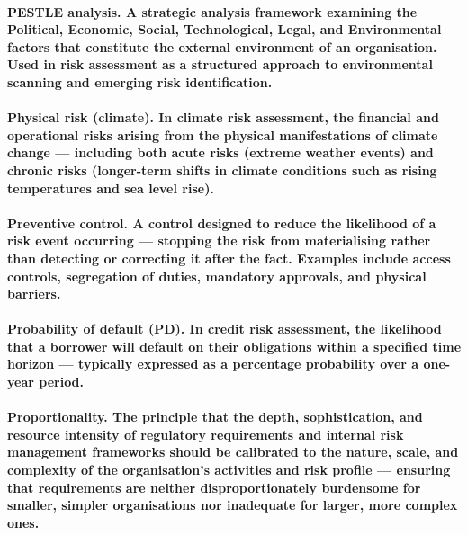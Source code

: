 \paragraph{\textbf{PESTLE analysis}. A strategic analysis framework examining the Political, Economic, Social, Technological, Legal, and Environmental factors that constitute the external environment of an organisation. Used in risk assessment as a structured approach to environmental scanning and emerging risk identification.}

\paragraph{\textbf{Physical risk (climate)}. In climate risk assessment, the financial and operational risks arising from the physical manifestations of climate change — including both acute risks (extreme weather events) and chronic risks (longer-term shifts in climate conditions such as rising temperatures and sea level rise).}

\paragraph{\textbf{Preventive control}. A control designed to reduce the likelihood of a risk event occurring — stopping the risk from materialising rather than detecting or correcting it after the fact. Examples include access controls, segregation of duties, mandatory approvals, and physical barriers.}

\paragraph{\textbf{Probability of default (PD)}. In credit risk assessment, the likelihood that a borrower will default on their obligations within a specified time horizon — typically expressed as a percentage probability over a one-year period.}

\paragraph{\textbf{Proportionality}. The principle that the depth, sophistication, and resource intensity of regulatory requirements and internal risk management frameworks should be calibrated to the nature, scale, and complexity of the organisation's activities and risk profile — ensuring that requirements are neither disproportionately burdensome for smaller, simpler organisations nor inadequate for larger, more complex ones.}

